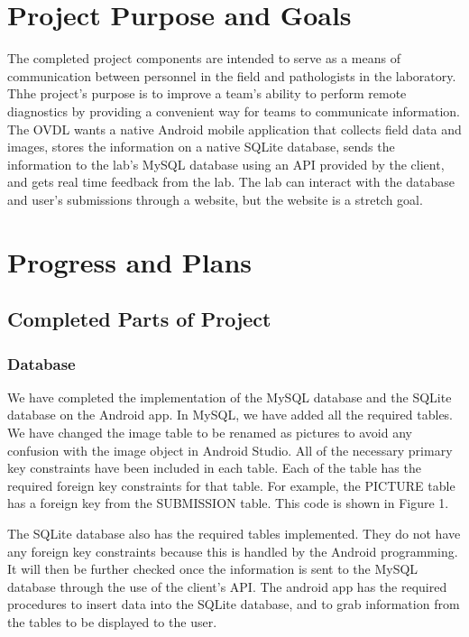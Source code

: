 \documentclass[onecolumn, draftclsnofoot,10pt, compsoc]{IEEEtran}
\begin{document}
\begin{titlepage}
\begin{singlespace}
\begin{abstract}
        \end{abstract}     
    \end{singlespace}
\end{titlepage}
\newpage
{}
\tableofcontents
\clearpage

\section{Project Purpose and Goals}
The completed project components are intended to serve as a means of communication between personnel in the field and pathologists in the laboratory. Thhe project's purpose is to improve a team's ability to perform remote diagnostics by providing a convenient way for teams to communicate information. The OVDL wants a native Android mobile application that collects field data and images, stores the information on a native SQLite database, sends the information to the lab’s MySQL database using an API provided by the client, and gets real time feedback from the lab. The lab can interact with the database and user's submissions through a website, but the website is a stretch goal.

\section{Progress and Plans}
\subsection{Completed Parts of Project}
\subsubsection{Database}
We have completed the implementation of the MySQL database and the SQLite database on the Android app. In MySQL, we have added all the required tables. We have changed the image table to be renamed as pictures to avoid any confusion with the image object in Android Studio. All of the necessary primary key constraints have been included in each table. Each of the table has the required foreign key constraints for that table. For example, the PICTURE table has a foreign key from the SUBMISSION table. This code is shown in Figure 1. 

The SQLite database also has the required tables implemented. They do not have any foreign key constraints because this is handled by the Android programming. It will then be further checked once the information is sent to the MySQL database through the use of the client's API. The android app has the required procedures to insert data into the SQLite database, and to grab information from the tables to be displayed to the user. 
\end{document}
